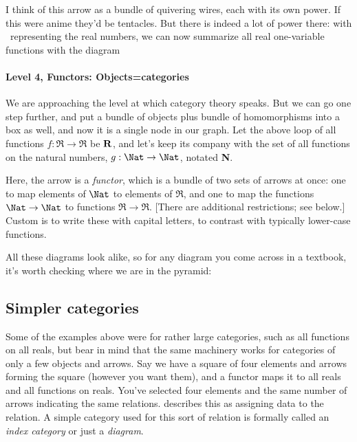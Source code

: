 \documentclass[11pt]{article}
\begin{document}
I think of this arrow as a bundle of quivering wires, each with its own power. If this were anime
they'd be tentacles. But there is indeed a lot of power there: with \Re\ representing the
real numbers, we can now summarize all real one-variable functions with the diagram 

\paragraph{Level 4, Functors: Objects=categories}
We are approaching the level at which category theory speaks. But we can go one step
further, and put a bundle of objects plus bundle of homomorphisms into a box as well, and
now it is a single node in our graph. Let the above loop of all functions $f:\Re\to\Re$
be $\bf R$, and let's keep its company with the set of all functions on the natural
numbers, $g:\Nat\to\Nat$, notated {\bf N}.


Here, the arrow is a {\em functor}, which is a bundle of two sets of arrows at once:
one to map elements of $\Nat$ to elements of $\Re$, and one to map the functions
$\Nat\to \Nat$ to functions $\Re\to \Re$. [There are additional restrictions; see
below.] Custom is to write these with capital letters, to contrast with typically
lower-case functions.

All these diagrams look alike, so for any diagram you come across in a textbook, it's
worth checking where we are in the pyramid:

\subsection{Simpler categories}
Some of the examples above were for rather large categories, such as all functions on all
reals, but bear in mind that the same machinery works for categories of only a few objects
and arrows. Say we have a square of four elements and arrows forming the square (however
you want them), and a functor maps it to all reals and all functions on reals. You've
selected four elements and the same number of arrows indicating the same relations.
\citet{leinster:basic} describes this as assigning data to the relation. A simple category
used for this sort of relation is formally called an {\em index category} or just a {\em diagram}. \label{diagramref}
\end{document}
